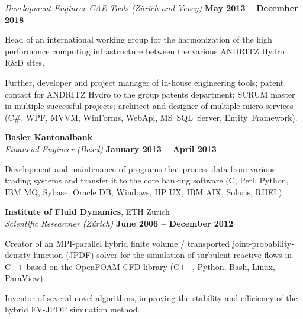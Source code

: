 \documentclass[line,11pt,a4paper]{resume}
\begin{document}
\begin{resume}
\textsl{Development Engineer CAE Tools (Zürich and Vevey)}
  \hfill \textbf{May 2013 -- December 2018}\\
\vspace{-4mm}%
\begin{list2}
  \item Head of an international working group for the harmonization of the
    high performance computing infrastructure between the various ANDRITZ Hydro
    R\&D sites.

  \item Further, developer and project manager of in-house engineering tools;
    patent contact for ANDRITZ Hydro to the group patents department; SCRUM
    master in multiple successful projects; architect and designer of multiple
    micro services (C\#, WPF, MVVM, WinForms, WebApi, MS~SQL~Server,
    Entity~Framework).
\end{list2}

\textbf{Basler Kantonalbank}\\\vspace{1mm}%
\textsl{Financial Engineer (Basel)}
  \hfill \textbf{January 2013 -- April 2013}\\
\vspace{-4mm}%
\begin{list2}
  \item Development and maintenance of programs that process data from various
    trading systems and transfer it to the core banking software (C, Perl,
    Python, IBM MQ, Sybase, Oracle DB, Windows, HP UX, IBM AIX, Solaris, RHEL).
\end{list2}

\textbf{Institute of Fluid Dynamics}, ETH Z\"urich\\\vspace{1mm}%
\textsl{Scientific Researcher (Zürich)}
  \hfill \textbf{June 2006 -- December 2012}\\
\vspace{-4mm}%
\begin{list2}
  \item Creator of an MPI-parallel hybrid finite volume / transported
    joint-probability-density function (JPDF) solver for the simulation of
    turbulent reactive flows in C++ based on the OpenFOAM CFD library (C++,
    Python, Bash, Linux, ParaView).

  \item Inventor of several novel algorithms, improving the stability and
    efficiency of the hybrid FV-JPDF simulation method.
\end{list2}


\end{resume}
\end{document}
